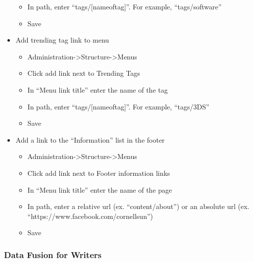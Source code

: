 \documentclass[10pt]{article} %
\begin{document}
\begin{itemize}
\begin{itemize}
	\item In path, enter “tags/[nameoftag]”. For example, “tags/software”
	\item Save
	\end{itemize}
\item Add trending tag link to menu
	\begin{itemize}
	\itemindent 10pt
	\item Administration-\textgreater Structure-\textgreater Menus
	\item Click add link next to Trending Tags
	\item In “Menu link title” enter the name of the tag
	\item In path, enter “tags/[nameoftag]”. For example, “tags/3DS”
	\item Save
	\end{itemize}
\item Add a link to the “Information” list in the footer
	\begin{itemize}
	\itemindent 10pt
	\item Administration-\textgreater Structure-\textgreater Menus
	\item Click add link next to Footer information links
	\item In “Menu link title” enter the name of the page
	\item In path, enter a relative url (ex. “content/about”) or an absolute url (ex. “https://www.facebook.com/cornellsun”)
	\item Save
	\end{itemize}
\end{itemize}

\subsubsection{Data Fusion for Writers}
\end{document}
